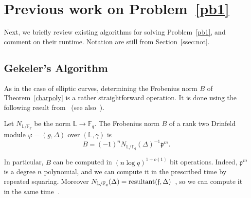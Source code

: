 \documentclass[sigconf]{acmart}
\newcommand{\F}{\mathbb{F}}
\renewcommand{\L}{\mathbb{L}}
\newcommand{\frakf}{\mathfrak{f}}
\newcommand{\frakp}{\mathfrak{p}}
\begin{document}

\section{Previous work on Problem~\ref{pb1}}

Next, we briefly review existing algorithms for solving
Problem~\ref{pb1}, and comment on their runtime. Notation are still
from Section~\ref{ssec:not}.


\subsection{Gekeler's Algorithm}\label{ssec:gek}

As in the case of elliptic curves, determining the Frobenius norm $B$
of Theorem~\ref{charpoly} is a rather straightforward operation. It is
done using the following result from~\cite[Th.~2.11]{frobdist} (see
also~\cite{HsYu00}).

\begin{proposition}\label{frobnorm}
Let $N_{\L/\F_q}$ be the norm $\L \to \F_q$. The Frobenius norm $B$ of a rank two Drinfeld module $\varphi=(g,\Delta)$ 
  over $(\L,\gamma)$ is
  \[B = (-1)^n N_{\L/\F_q}(\Delta)^{-1}\frakp^m.\]
\end{proposition}
In particular, $B$ can be computed in $(n \log q)^{1+o(1)}$ bit
operations. Indeed, $\frakp^m$ is a degree $n$ polynomial, and we can
compute it in the prescribed time by repeated squaring. Moreover
$N_{\L/\F_q}(\Delta) =
\textnormal{resultant}(\frakf,\Delta)$~\cite{Pohst:1989:AAN:76692},
so we can compute it in the same time~\cite{Gathen:2003:MCA:945759}.
\end{document}
